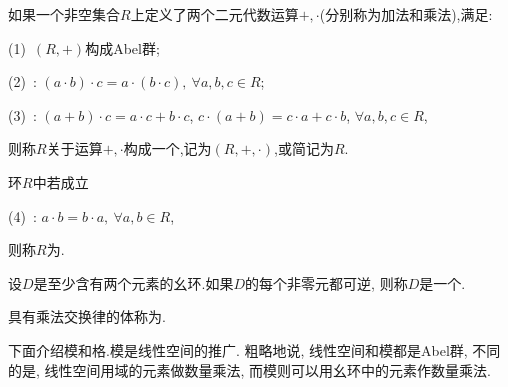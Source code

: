 \begin{definition}[环]
	如果一个非空集合$R$上定义了两个二元代数运算$+,\cdot$(分别称为加法和乘法),满足:
	\begin{blist}
		\item (1)~$(R,+)$构成Abel群;
		\item (2)~: $(a\cdot b)\cdot c = a\cdot (b\cdot c),~\forall a,b,c\in R$;
		\item (3)~: $(a+b)\cdot c = a\cdot c + b\cdot c$, $c\cdot(a+b) = c\cdot a+c\cdot b$, $\forall a,b,c\in R$,
	\end{blist}
	则称$R$关于运算$+,\cdot$构成一个,记为$(R,+,\cdot)$,或简记为$R$.
	
	环$R$中若成立
	\begin{blist}
		\item (4)~: $a\cdot b = b\cdot a, ~\forall a,b\in R$,
	\end{blist}
	则称$R$为.
\end{definition}

\begin{definition}[体、域]
	设$D$是至少含有两个元素的幺环.如果$D$的每个非零元都可逆, 则称$D$是一个.
	
	具有乘法交换律的体称为.
\end{definition}

下面介绍模和格.模是线性空间的推广. 粗略地说, 线性空间和模都是Abel群, 不同的是, 线性空间用域的元素做数量乘法, 而模则可以用幺环中的元素作数量乘法.


